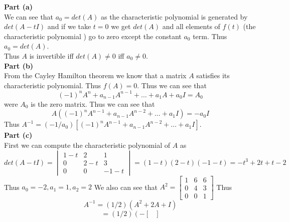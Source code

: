 \documentclass[answers,12pt,addpoints]{exam}
\begin{document}
\begin{questions}
    \begin{solution}
        \textbf{Part (a)}\\
        We can see that $a_0 = det(A)$ as the characteristic polynomial is generated by $det(A-tI)$ and if we take $t = 0$ we get $det(A)$ and all elements of $f(t)$ (the characteristic polynomial ) go to zero except the constant $a_0$ term. Thus $a_0 = det(A)$.\\
        Thus $A$ is invertible iff $det(A) \neq 0$ iff $a_0 \neq 0$.\\
        \textbf{Part (b)}\\
        From the Cayley Hamilton theorem we know that a matrix $A$ satisfies its characteristic polynomial. Thus $f(A) = 0$. Thus we can see that
        $$ (-1)^n A^n + a_{n-1}A^{n-1} + \dots + a_1 A + a_0I = A_0$$
        were $A_0$ is the zero matrix. Thus we can see that
        $$A ( (-1)^n A^{n-1} + a_{n-1}A^{n-2} + \dots + a_1I) = -a_0I$$
        Thus $A^{-1} = (-1/a_0)[(-1)^n A^{n-1} + a_{n-1}A^{n-2} + \dots + a_1I]$.\\
        \textbf{Part (c)}\\
        First we can compute the characteristic polynomial of $A$ as
        $$det(A-tI) = \begin{vmatrix}
            1-t & 2 & 1\\
            0 & 2-t & 3\\
            0 & 0 & -1-t
        \end{vmatrix} = (1-t)(2-t)(-1-t) = -t^3 + 2t +t -2 $$
        Thus $a_0 = -2, a_1 = 1, a_2 = 2$
        We also can see that $A^2 = \begin{bmatrix}
            1 & 6 & 6\\
            0 & 4 & 3\\
            0 & 0 & 1
        \end{bmatrix}$
        Thus 
        $$ A^{-1} = (1/2)\left( A^2 + 2A +I\right)$$
        $$ = (1/2)\left(- \begin{bmatrix}

\end{bmatrix}$$
\end{solution}
\end{questions}
\end{document}
